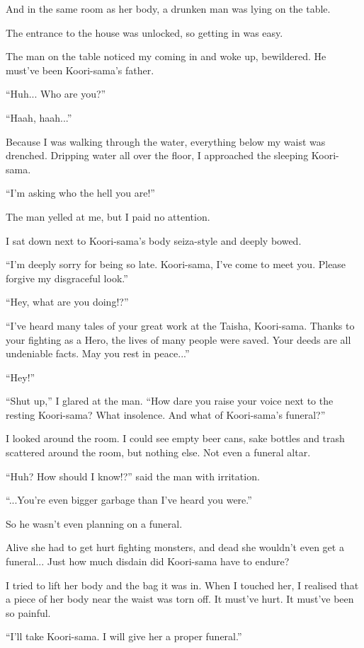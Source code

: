 And in the same room as her body, a drunken man was lying on the table.

The entrance to the house was unlocked, so getting in was easy.

The man on the table noticed my coming in and woke up, bewildered. He must've been Koori-sama's father.

``Huh... Who are you?''

``Haah, haah...''

Because I was walking through the water, everything below my waist was drenched. Dripping water all over the floor, I approached the sleeping Koori-sama.

``I'm asking who the hell you are!''

The man yelled at me, but I paid no attention.

I sat down next to Koori-sama's body seiza-style and deeply bowed.

``I'm deeply sorry for being so late. Koori-sama, I've come to meet you. Please forgive my disgraceful look.''

``Hey, what are you doing!?''

``I've heard many tales of your great work at the Taisha, Koori-sama. Thanks to your fighting as a Hero, the lives of many people were saved. Your deeds are all undeniable facts. May you rest in peace...''

``Hey!''

``Shut up,'' I glared at the man. ``How dare you raise your voice next to the resting Koori-sama? What insolence. And what of Koori-sama's funeral?''

I looked around the room. I could see empty beer cans, sake bottles and trash scattered around the room, but nothing else. Not even a funeral altar.

``Huh? How should I know!?'' said the man with irritation.

``...You're even bigger garbage than I've heard you were.''

So he wasn't even planning on a funeral.

Alive she had to get hurt fighting monsters, and dead she wouldn't even get a funeral... Just how much disdain did Koori-sama have to endure?

I tried to lift her body and the bag it was in. When I touched her, I realised that a piece of her body near the waist was torn off. It must've hurt. It must've been so painful.

``I'll take Koori-sama. I will give her a proper funeral.''


